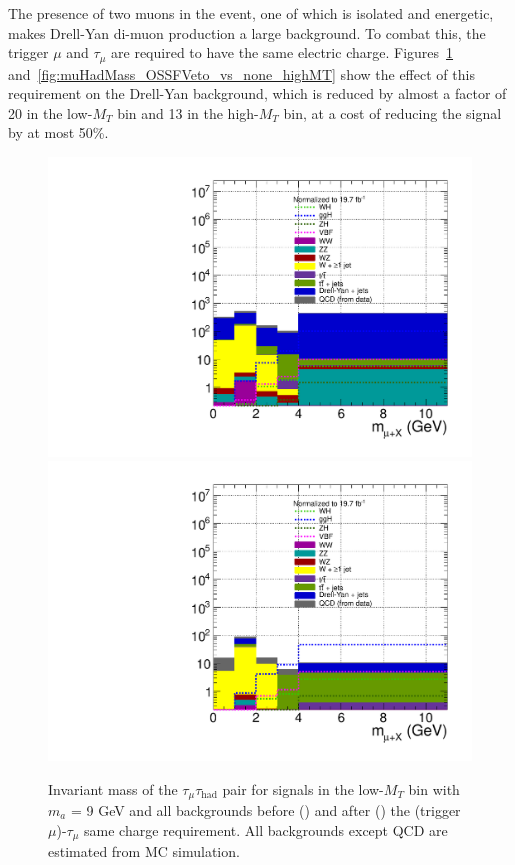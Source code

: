 The presence of two muons in the event, one of which is isolated and energetic, makes Drell-Yan di-muon production a large background.  To combat this, the trigger $\mu$ and $\tau_{\mu}$ are required to have the same electric charge.  Figures~\ref{fig:muHadMass_OSSFVeto_vs_none_lowMT} and~\ref{fig:muHadMass_OSSFVeto_vs_none_highMT} show the effect of this requirement on the Drell-Yan background, which is reduced by almost a factor of 20 in the low-$M_{T}$ bin and 13 in the high-$M_{T}$ bin, at a cost of reducing the signal by at most 50\%.

\begin{figure}[hbtp]
  \begin{center}
    \includegraphics[width=1.2\cmsFigWidth]{figures/muHadMass_lowMT_beforeOSSF}
    \includegraphics[width=1.2\cmsFigWidth]{figures/muHadMass_lowMT_afterOSSF}
    \caption{Invariant mass of the $\tau_{\mu}\tau_{\text{had}}$ pair for signals in the low-$M_{T}$ bin with $m_a$ = 9 GeV and all backgrounds before (\cmsLeft) and after (\cmsRight) the (trigger $\mu$)-$\tau_{\mu}$ same charge requirement.  All backgrounds except QCD are estimated from MC simulation. }
    \label{fig:muHadMass_OSSFVeto_vs_none_lowMT}
  \end{center}
\end{figure}

